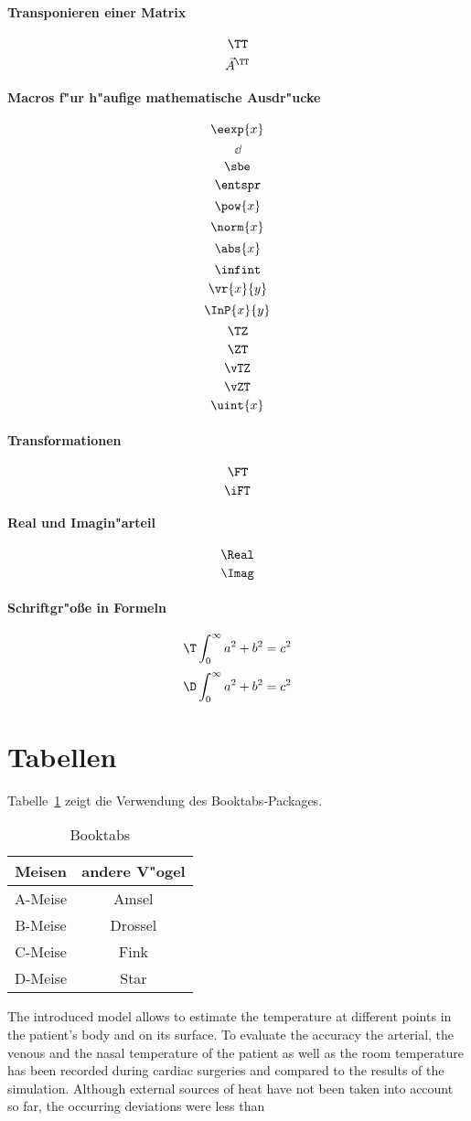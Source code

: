 \paragraph{Transponieren einer Matrix}
$$\TT$$
$$\vec{A}^\TT$$

\paragraph{Macros f"ur h"aufige mathematische Ausdr"ucke}
$$\eexp{x}$$
$$\dd$$
$$\sbe$$
$$\entspr$$
$$\pow{x}$$
$$\norm{x}$$
$$\abs{x}$$
$$\infint$$
$$\vr{x}{y}$$
$$\InP{x}{y}$$
$$\TZ$$
$$\ZT$$
$$\vTZ$$
$$\vZT$$
$$\uint{x}$$


\paragraph{Transformationen}
$$\FT$$
$$\iFT$$


\paragraph{Real und Imagin"arteil}
$$\Real$$
$$\Imag$$

\paragraph{Schriftgr"o{\ss}e in Formeln}
$$\T \int_{0}^{\infty}{a^2+b^2=c^2}$$
$$\D \int_{0}^{\infty}{a^2+b^2=c^2}$$

\section{Tabellen}

Tabelle~\ref{tab:booktabs} zeigt die Verwendung des Booktabs-Packages.

\begin{table}[ht]
    \centering
    \caption{Booktabs\label{tab:booktabs}}
    \begin{tabular}{cc}
        \toprule
        Meisen & andere V"ogel\\
        \midrule
        A-Meise & Amsel\\
        B-Meise & Drossel\\
        C-Meise & Fink\\
        D-Meise & Star\\
        \bottomrule
    \end{tabular}
\end{table}

The introduced model allows to estimate the temperature at different points in the patient's body and on its surface. To evaluate the accuracy the arterial, the venous and the nasal temperature of the patient as well as the room temperature has been recorded during cardiac surgeries and compared to the results of the simulation. Although external sources of heat have not been taken into account so far, the occurring deviations were less than

